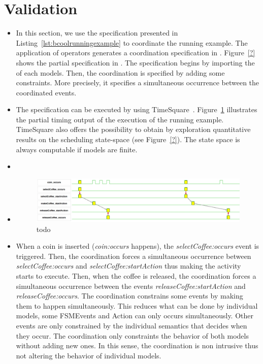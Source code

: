 \section{Validation}
\label{sec:validation}
\begin{itemize}
	\item In this section, we use the \bcool specification presented in Listing~\ref{lst:bcoolrunningexample} to coordinate the running example. The application of \bcool operators generates a coordination specification in \ccsl. Figure~\ref{?} shows the partial specification in \ccsl. The specification begins by importing the \ccsl of each models. Then, the coordination is specified by adding some constraints. More precisely, it specifies a simultaneous occurrence between the coordinated events.      
	
	
	 \item The \ccsl specification can be executed by using TimeSquare~\cite{timesquarebib}. Figure~\ref{fig:coffemachinevcd} illustrates the partial timing output of the execution of the running example. TimeSquare also offers the possibility to obtain by exploration quantitative results on the scheduling state-space (see Figure~\ref{?}). The state space is always computable if models are finite. 
	
	 \item {}
	  \item {}
	\begin{figure}[h]
	  	\center
	  	\includegraphics[width=.9\textwidth]{bcool/figs/coffeemachinevcd}
	  	\caption{todo}
	  	\label{fig:coffemachinevcd}
	\end{figure}
	
	\item When a coin is inserted (\emph{coin:occurs} happens), the \emph{selectCoffee:occurs} event is triggered. Then, the coordination forces a simultaneous occurrence between \emph{selectCoffee:occurs} and \emph{selectCoffee:startAction} thus making the activity starts to execute. Then, when the coffee is released, the coordination forces a simultaneous occurrence between the events \emph{releaseCoffee:startAction} and \emph{releaseCoffee:occurs}. The coordination constrains some events by making them to happen simultaneously. This reduces what can be done by individual models, \ie some FSMEvents and Action can only occurs simultaneously. Other events are only constrained by the individual semantics that decides when they occur. The coordination only constraints the behavior of both models without adding new ones. In this sense, the coordination is non intrusive thus not altering the behavior of individual models. 
	
\end{itemize}